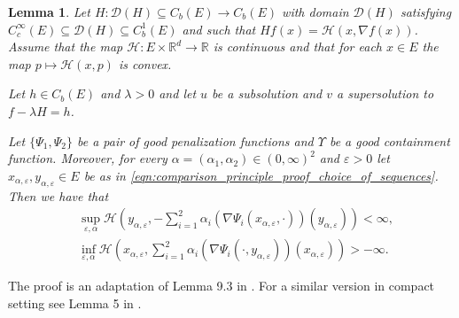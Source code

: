 \documentclass[a4paper]{article}
\newcommand{\cD}{\mathcal{D}}
\newcommand{\cH}{\mathcal{H}}
\newcommand{\bR}{\mathbb{R}}
\numberwithin{equation}{section}
\newtheorem{lemma}[theorem]{Lemma}
\theoremstyle{definition}
\begin{document}
\begin{lemma} \label{lemma:control_on_H}
	Let $H : \cD(H) \subseteq C_b(E) \rightarrow C_b(E)$ with domain $\cD(H)$ satisfying $C_c^\infty(E) \subseteq \cD(H) \subseteq C_b^1(E)$ and such that $Hf(x) = \cH(x,\nabla f(x))$. Assume that the map $\cH : E \times \bR^d \rightarrow \bR$ is continuous and that for each $x \in E$ the map $p \mapsto \cH(x,p)$ is convex.
	
	Let $h \in C_b(E)$ and $\lambda > 0$ and let $u$ be a subsolution and $v$ a supersolution to $f - \lambda H = h$. 
	
	Let $\{\Psi_1,\Psi_2\}$ be a pair of good penalization functions and $\Upsilon$ be a good containment function. Moreover, for every $\alpha = (\alpha_1,\alpha_2) \in (0,\infty)^2$ and $\varepsilon >0$ let $x_{\alpha,\varepsilon},y_{\alpha,\varepsilon} \in E$ be as in \eqref{eqn:comparison_principle_proof_choice_of_sequences}. Then we have that
	\begin{align} 
		& \sup_{\varepsilon, \alpha} \cH\left(y_{\alpha,\varepsilon}, - \sum_{i=1}^2\alpha_i (\nabla \Psi_i(x_{\alpha,\varepsilon},\cdot))(y_{\alpha,\varepsilon})\right) < \infty, \label{eqn:control_on_H_sup} \\
		& \inf_{\varepsilon, \alpha} \cH\left(x_{\alpha,\varepsilon},  \sum_{i=1}^2\alpha_i (\nabla \Psi_i(\cdot,y_{\alpha,\varepsilon}))(x_{\alpha,\varepsilon})\right) > -\infty. \label{eqn:control_on_H_inf} 
	\end{align}
\end{lemma}

The proof is an adaptation of Lemma 9.3 in \cite{FK06}. For a similar version in compact setting see Lemma 5 in \cite{Kr16b}.
\end{document}
